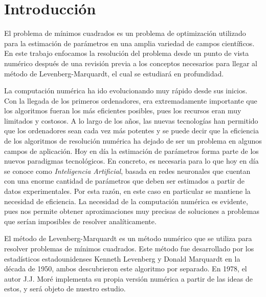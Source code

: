 \documentclass[11pt,a4paper]{book}
\theoremstyle{definition}
\theoremstyle{remark}
\begin{document}
\clearpage

\thispagestyle{empty}


\chapter*{Introducci\'on}

El problema de mínimos cuadrados es un problema de optimización utilizado para la estimación de parámetros en una amplia variedad de campos científicos. En este trabajo enfocamos la resolución del problema desde un punto de vista numérico después de una revisión previa a los conceptos necesarios para llegar al método de Levenberg-Marquardt, el cual se estudiará en profundidad. 

La computación numérica ha ido evolucionando muy rápido desde sus inicios. Con la llegada de los primeros ordenadores, era extremadamente importante que los algoritmos fueran los más eficientes posibles, pues los recursos eran muy limitados y costosos. A lo largo de los años, las nuevas tecnologías han permitido que los ordenadores sean cada vez más potentes y se puede decir que la eficiencia de los algoritmos de resolución numérica ha dejado de ser un problema en algunos campos de aplicación.
Hoy en día la estimación de parámetros forma parte de los nuevos paradigmas tecnológicos. En concreto, es necesaria para lo que hoy en día se conoce como \textit{Inteligencia Artificial}, basada en redes neuronales que cuentan con una enorme cantidad de parámetros que deben ser estimados a partir de datos experimentales. Por esta razón, en este caso en particular se mantiene la necesidad de eficiencia.
La necesidad de la computación numérica es evidente, pues nos permite obtener aproximaciones muy precisas de soluciones a problemas que serían imposibles de resolver analíticamente.

El método de Levenberg-Marquardt es un método numérico que se utiliza para resolver problemas de mínimos cuadrados. Este método fue desarrollado por los estadísticos estadounidenses Kenneth Levenberg \cite{Levenberg1944-wb} y Donald Marquardt \cite{Marquardt1963-ds} en la década de 1950, ambos descubrieron este algoritmo por separado. En 1978, el autor J.J. Moré \cite{More1978-at} implementa su propia versión numérica a partir de las ideas de estos, y será objeto de nuestro estudio.
\end{document}
